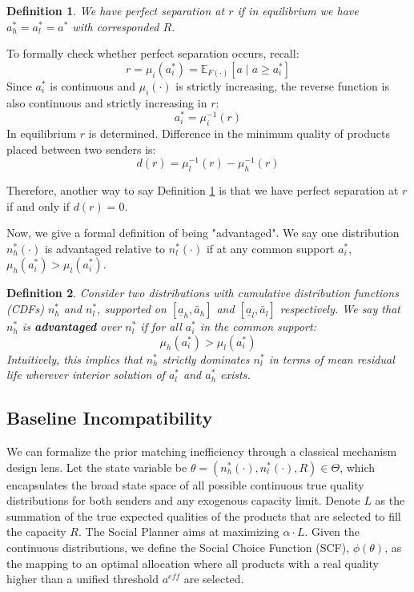 \documentclass[12pt, a4paper]{article}
\newtheorem{definition}{Definition}
\begin{document}
\begin{definition}
    \label{def: Perfect Separation}
    We have perfect separation at $r$ if in equilibrium we have $a^*_h=a^*_l=a^*$ with corresponded $R$. 
\end{definition}

To formally check whether perfect separation occurs, recall:
\[
        r =\mu_i(a_i^*)= \mathbb{E}_{F(\cdot)}[a \mid a \geq a^*_i]
    \]
Since $a^*_i$ is continuous and $\mu_i(\cdot)$ is strictly increasing, the reverse function is also continuous and strictly increasing in $r$:
\[
        a_i^*=\mu^{-1}_i(r)
    \]
In equilibrium $r$ is determined. Difference in the minimum quality of products placed between two senders is:
\[d(r)=\mu_l^{-1}(r)-\mu_h^{-1}(r)\]

Therefore, another way to say Definition \ref{def: Perfect Separation} is that we have perfect separation at $r$ if and only if $d(r)=0$. 

Now, we give a formal definition of being "advantaged". We say one distribution $n_h^*(\cdot)$ is advantaged relative to $n_l^*(\cdot)$ if at any common support $a^*_i$, $\mu_h(a_i^*)>\mu_l(a_i^*)$.

\begin{definition}
    \label{def: advantaged}
    Consider two distributions with cumulative distribution functions (CDFs) $n_h^*$ and $n_l^*$, supported on $[\underline{a}_h, \bar{a}_h]$ and $[\underline{a}_l, \bar{a}_l]$ respectively. We say that $n_h^*$ is \textbf{advantaged} over $n_l^*$ if for all $a^*_i$ in the common support:\[
        \mu_h(a^*_i) > \mu_l(a^*_i)
    \]Intuitively, this implies that $n_h^*$ strictly dominates $n_l^*$ in terms of mean residual life wherever interior solution of $a^*_l$ and $a^*_h$ exists.
\end{definition}


\subsection{Baseline Incompatibility}

We can formalize the prior matching inefficiency through a classical mechanism design lens. Let the state variable be $\theta = (n_h^*(\cdot), n_l^*(\cdot), R) \in \Theta$, which encapsulates the broad state space of all possible continuous true quality distributions for both senders and any exogenous capacity limit. Denote $L$ as the summation of the true expected qualities of the products that are selected to fill the capacity $R$. The Social Planner aims at maximizing $\alpha \cdot L$. Given the continuous distributions, we define the Social Choice Function (SCF), $\phi(\theta)$, as the mapping to an optimal allocation where all products with a real quality higher than a unified threshold $a^{eff}$ are selected. 
\end{document}
